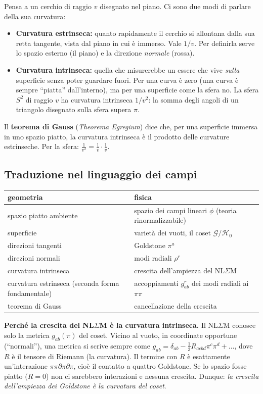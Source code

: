 \documentclass[11pt,a4paper]{article}
\numberwithin{equation}{section}
\theoremstyle{remark}
\newcommand{\G}{\mathcal{G}}
\newcommand{\Hg}{\mathcal{H}_0}
\begin{document}
Pensa a un cerchio di raggio $v$ disegnato nel piano. Ci sono due modi di parlare della sua curvatura:
\begin{itemize}
\item \textbf{Curvatura estrinseca:} quanto rapidamente il cerchio si allontana dalla sua retta tangente, vista dal piano in cui è immerso. Vale $1/v$. Per definirla serve lo spazio esterno (il piano) e la direzione \emph{normale} (rossa).
\item \textbf{Curvatura intrinseca:} quella che misurerebbe un essere che vive \emph{sulla} superficie senza poter guardare fuori. Per una curva è zero (una curva è sempre ``piatta'' dall'interno), ma per una superficie come la sfera no. La sfera $S^2$ di raggio $v$ ha curvatura intrinseca $1/v^2$: la somma degli angoli di un triangolo disegnato sulla sfera supera $\pi$.
\end{itemize}
Il \textbf{teorema di Gauss} (\emph{Theorema Egregium}) dice che, per una superficie immersa in uno spazio piatto, la curvatura intrinseca è il prodotto delle curvature estrinseche. Per la sfera: $\frac1{v^2}=\frac1v\cdot\frac1v$.

\subsection{Traduzione nel linguaggio dei campi}

\begin{center}
\begin{tabular}{p{}p{}}
\hline
geometria & fisica\\
\hline
spazio piatto ambiente & spazio dei campi lineari $\phi$ (teoria rinormalizzabile)\\
superficie & varietà dei vuoti, il coset $\G/\Hg$\\
direzioni tangenti & Goldstone $\pi^a$\\
direzioni normali & modi radiali $\rho^r$\\
curvatura intrinseca & crescita dell'ampiezza del NL$\Sigma$M\\
curvatura estrinseca (seconda forma fondamentale) & accoppiamenti $g^r_{ab}$ dei modi radiali ai $\pi\pi$\\
teorema di Gauss & cancellazione della crescita\\
\hline
\end{tabular}
\end{center}

\textbf{Perché la crescita del NL$\Sigma$M è la curvatura intrinseca.} Il NL$\Sigma$M conosce solo la metrica $g_{ab}(\pi)$ del coset. Vicino al vuoto, in coordinate opportune (``normali''), una metrica si scrive sempre come $g_{ab}=\delta_{ab}-\frac13R_{acbd}\pi^c\pi^d+\dots$, dove $R$ è il tensore di Riemann (la curvatura). Il termine con $R$ è esattamente un'interazione $\pi\pi\partial\pi\partial\pi$, cioè il contatto a quattro Goldstone. Se lo spazio fosse piatto ($R=0$) non ci sarebbero interazioni e nessuna crescita. Dunque: \emph{la crescita dell'ampiezza dei Goldstone è la curvatura del coset}.
\end{document}
